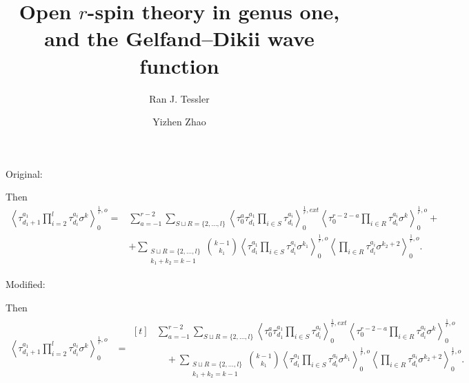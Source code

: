 \documentclass[11pt]{amsart}
\title{Open $r$-spin theory in genus one, and the Gelfand--Dikii wave function}
\date{}
\author{Ran J. Tessler \and Yizhen Zhao}
\theoremstyle{definition}
\theoremstyle{remark}
\newcommand{\<}{\left<}
\renewcommand{\>}{\right>}
\numberwithin{equation}{section}
\begin{document}
Original:

Then
\begin{align*}
\< \tau_{d_1+1}^{a_1}\prod_{i=2}^l\tau^{a_i}_{d_i}\sigma^k\>^{\frac{1}{r},o}_0=&
\sum_{a=-1}^{r-2}\sum_{S \sqcup R = \{2,\ldots,l\}}\left\langle \tau_0^{a}\tau_{d_1}^{a_1}\prod_{i \in S}\tau_{d_i}^{a_i}\right\rangle^{\frac{1}{r},{ext}}_0
\left\langle \tau_0^{r-2-a}\prod_{i\in R}\tau^{a_i}_{d_i}\sigma^k\right\rangle^{\frac{1}{r},o}_0+\\
&+\sum_{\substack{S \sqcup R = \{2,\ldots,l\} \\ k_1 + k_2 = k-1}} \binom{k-1}{k_1} \left\langle \tau^{a_1}_{d_1}\prod_{i \in S} \tau^{a_i}_{d_i}\sigma^{k_1}\right\rangle^{\frac{1}{r},o}_0 \left\langle \prod_{i \in R} \tau^{a_i}_{d_i} \sigma^{k_2+2}\right\rangle^{\frac{1}{r}, o}_0.
\end{align*}


Modified:

Then
\begin{align*}
\< \tau_{d_1+1}^{a_1}\prod_{i=2}^l\tau^{a_i}_{d_i}\sigma^k\>^{\frac{1}{r},o}_0
&= \begin{aligned}[t] 
&\sum_{a=-1}^{r-2}\sum_{S \sqcup R = \{2,\ldots,l\}}\left\langle \tau_0^{a}\tau_{d_1}^{a_1}\prod_{i \in S}\tau_{d_i}^{a_i}\right\rangle^{\frac{1}{r},{ext}}_0
\left\langle \tau_0^{r-2-a}\prod_{i\in R}\tau^{a_i}_{d_i}\sigma^k\right\rangle^{\frac{1}{r},o}_0 \\
&\quad +\sum_{\substack{S \sqcup R = \{2,\ldots,l\} \\ k_1 + k_2 = k-1}} \binom{k-1}{k_1} \left\langle \tau^{a_1}_{d_1}\prod_{i \in S} \tau^{a_i}_{d_i}\sigma^{k_1}\right\rangle^{\frac{1}{r},o}_0 \left\langle \prod_{i \in R} \tau^{a_i}_{d_i} \sigma^{k_2+2}\right\rangle^{\frac{1}{r}, o}_0.
\end{aligned}
\end{align*}
\end{document}
